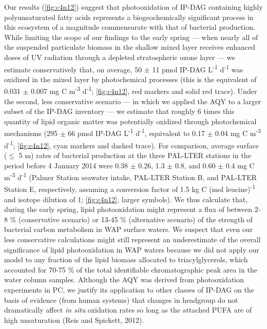 Our results (\autoref{fig:c4n12}) suggest that photooxidation of IP-DAG containing highly polyunsaturated fatty acids represents a biogeochemically significant process in this ecosystem of a magnitude commensurate with that of bacterial production. While limiting the scope of our findings to the early spring --- when nearly all of the suspended particulate biomass in the shallow mixed layer receives enhanced doses of UV radiation through a depleted stratospheric ozone layer --- we estimate conservatively that, on average, 50 $\pm$ 11 pmol IP-DAG L\textsuperscript{-1} d\textsuperscript{-1} was oxidized in the mixed layer by photochemical processes (this is the equivalent of 0.031 $\pm$ 0.007 mg C m\textsuperscript{-3} d\textsuperscript{-1}; \autoref{fig:c4n12}, red markers and solid red trace). Under the second, less conservative scenario --- in which we applied the AQY to a larger subset of the IP-DAG inventory --- we estimate that roughly 6 times this quantity of lipid organic matter was potentially oxidized through photochemical mechanisms (295 $\pm$ 66 pmol IP-DAG L\textsuperscript{-1} d\textsuperscript{-1}, equivalent to 0.17 $\pm$ 0.04 mg C m\textsuperscript{-3} d\textsuperscript{-1}; \autoref{fig:c4n12}, cyan markers and dashed trace). For comparison, average surface ($\leq$ 5 m) rates of bacterial production at the three PAL-LTER stations in the period before 4 January 2014 were 0.38 $\pm$ 0.26, 1.3 $\pm$ 0.8, and 0.60 $\pm$ 0.4 mg C m\textsuperscript{-3} d\textsuperscript{-1} (Palmer Station seawater intake, PAL-LTER Station B, and PAL-LTER Station E, respectively, assuming a conversion factor of 1.5 kg C (mol leucine)\textsuperscript{-1} and isotope dilution of 1; \autoref{fig:c4n12}, larger symbols). We thus calculate that, during the early spring, lipid photooxidation might represent a flux of between 2-8 \% (conservative scenario) or 13-45 \% (alternative scenario) of the strength of bacterial carbon metabolism in WAP surface waters. We suspect that even our less conservative calculations might still represent an underestimate of the overall significance of lipid photooxidation in WAP waters because we did not apply our model to any fraction of the lipid biomass allocated to triacylglycerols, which accounted for 70-75 \% of the total identifiable chromatographic peak area in the water column samples. Although the AQY was derived from photooxidation experiments in PC, we justify its application to other classes of IP-DAG on the basis of evidence (from human systems) that changes in headgroup do not dramatically affect \emph{in situ} oxidation rates so long as the attached PUFA are of high unsaturation (Reis and Spickett, 2012).

